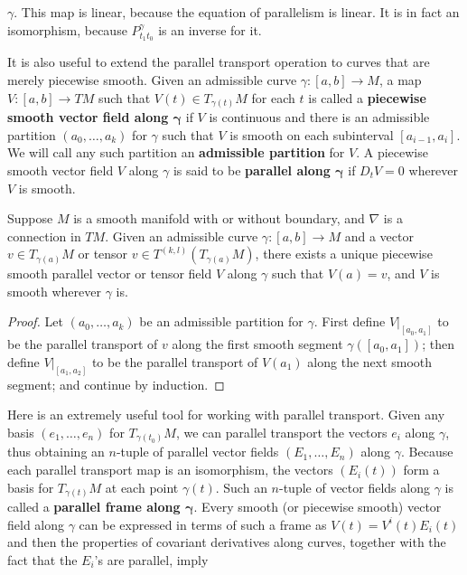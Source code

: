 $\gamma$. This map is linear, because the equation of parallelism is linear. It is in fact an isomorphism, because $P_{t_1t_0}^{\gamma}$ is an inverse for it.\par
It is also useful to extend the parallel transport operation to curves that are merely piecewise smooth. Given an admissible curve $\gamma:[a,b]\to M$, a map $V:[a,b]\to TM$ 
such that $V(t)\in T_{\gamma(t)}M$ for each $t$ is called a \textbf{piecewise smooth vector field along $\bm{\gamma}$} if $V$ is continuous and there is an admissible 
partition $(a_0,\dots,a_k)$ for $\gamma$ such that $V$ is smooth on each subinterval $[a_{i-1},a_{i}]$. We will call any such partition an \textbf{admissible partition} 
for $V$. A piecewise smooth vector field $V$ along $\gamma$ is said to be \textbf{parallel along $\bm{\gamma}$} if $D_tV=0$ wherever $V$ is smooth.
\begin{corollary}
Suppose $M$ is a smooth manifold with or without boundary, and $\nabla$ is a connection in $TM$. Given an admissible curve $\gamma:[a,b]\to M$ and a vector 
$v\in T_{\gamma(a)}M$ or tensor $v\in T^{(k,l)}(T_{\gamma(a)}M)$, there exists a unique piecewise smooth parallel vector or tensor field $V$ along $\gamma$ such 
that $V(a)=v$, and $V$ is smooth wherever $\gamma$ is.
\end{corollary}
\begin{proof}
Let $(a_0,\dots,a_k)$ be an admissible partition for $\gamma$. First define $V|_{[a_0,a_1]}$ to be the parallel transport of $v$ along the first smooth segment 
$\gamma([a_0,a_1])$; then define $V|_{[a_1,a_2]}$ to be the parallel transport of $V(a_1)$ along the next smooth segment; and continue by induction.
\end{proof}
Here is an extremely useful tool for working with parallel transport. Given any basis $(e_1,\dots,e_n)$ for $T_{\gamma(t_0)}M$, we can parallel transport the vectors 
$e_i$ along $\gamma$, thus obtaining an $n$-tuple of parallel vector fields $(E_1,\dots,E_n)$ along $\gamma$. Because each parallel transport map is an isomorphism, 
the vectors $(E_i(t))$ form a basis for $T_{\gamma(t)}M$ at each point $\gamma(t)$. Such an $n$-tuple of vector fields along $\gamma$ is called a \textbf{parallel frame along 
$\bm{\gamma}$}. Every smooth (or piecewise smooth) vector field along $\gamma$ can be expressed in terms of such a frame as $V(t)=V^i(t)E_i(t)$ and then the properties 
of covariant derivatives along curves, together with the fact that the $E_i$'s are parallel, imply
